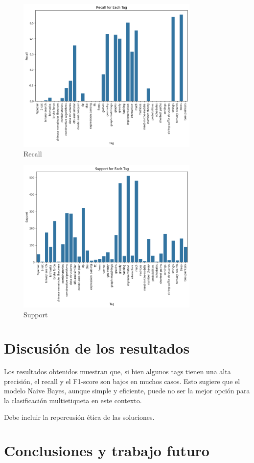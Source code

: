 \documentclass{article}
\begin{document}
\begin{figure}[H]
    \centering
    \includegraphics[width=0.8\textwidth]{imgs/recallnb.png}
    \caption{Recall}
    \label{fig:r}
\end{figure}
\begin{figure}[H]
    \centering
    \includegraphics[width=0.8\textwidth]{imgs/supportnb.png}
    \caption{Support}
    \label{fig:s}
\end{figure}

\section{Discusión de los resultados}
Los resultados obtenidos muestran que, si bien algunos tags tienen una alta precisión, el recall y el F1-score son bajos en muchos casos. Esto sugiere que el modelo Naive Bayes, aunque simple y eficiente, puede no ser la mejor opción para la clasificación multietiqueta en este contexto.


Debe incluir la repercusión ética de las soluciones.

\section{Conclusiones y trabajo futuro}
\end{document}
